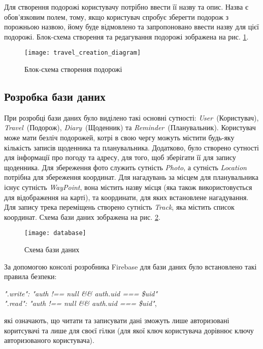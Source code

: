 \documentclass[../main.tex]{subfiles}
\begin{document}
Для створення подорожі користувачу потрібно ввести її назву та опис. Назва є обов'язковим полем, тому, якщо користувач спробує зберегти подорож з порожньою назвою, йому буде відмовлено та запропоновано ввести назву для цієї подорожі. Блок-схема створення та редагування подорожі зображена на рис. \ref{diagram:travel_creation}.

\begin{figure}[H]
	\centering
	\texttt{[image: travel\_creation\_diagram]}
	\caption{Блок-схема створення подорожі}
	\label{diagram:travel_creation}
\end{figure}

\subsection{Розробка бази даних}
При розробці бази даних було виділено такі основні сутності: \textit{User}~(Користувач), \textit{Travel}~(Подорож), \textit{Diary}~(Щоденник) та \textit{Reminder}~(Планувальник). Користувач може мати безліч подорожей, котрі в свою чергу можуть містити будь-яку кількість записів щоденника та планувальника. Додатково, було створено сутності для інформації про погоду та адресу, для того, щоб зберігати її для запису щоденника. Для збереження фото служить сутність \textit{Photo}, а сутність \textit{Location} потрібна для збереження координат. Для нагадувань за місцем для планувальника існує сутність \textit{WayPoint}, вона містить назву місця (яка також використовується для відображення на карті), та  координати, для яких встановлене нагадування. Для запису трека переміщень створено сутність \textit{Track}, яка містить список координат. Схема бази даних зображена на рис. \ref{diagram:database}.

\begin{figure}[H]
	\centering
	\texttt{[image: database]}
	\caption{Схема бази даних}
	\label{diagram:database}
\end{figure}

За допомогою консолі розробника Firebase для бази даних було встановлено такі правила безпеки:
\begin{center}
	\textit{".write": "auth !== null \&\& auth.uid === \$uid"}\\
	\textit{".read": "auth !== null \&\& auth.uid === \$uid"},
\end{center}

які означають, що читати та записувати дані зможуть лише авторизовані коритсувачі та лише для своєї гілки (для якої ключ користувача дорівнює ключу авторизованого користувача).
\end{document}
